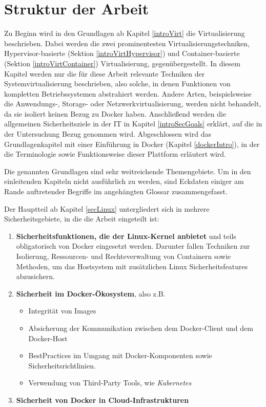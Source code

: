 \documentclass[../main.tex]{subfiles}
\begin{document}

  \section{Struktur der Arbeit}
    Zu Beginn wird in den Grundlagen ab Kapitel \ref{introVirt} die Virtualisierung beschrieben. Dabei werden die zwei prominentesten Virtualisierungstechniken, Hypervisor-basierte (Sektion \ref{introVirtHypervisor}) und Container-basierte (Sektion \ref{introVirtContainer}) Virtualisierung, gegenübergestellt. In diesem Kapitel werden nur die für diese Arbeit relevante Techniken der Systemvirtualisierung beschrieben, also solche, in denen Funktionen von kompletten Betriebssystemen abstrahiert werden. Andere Arten, beispielsweise die Anwendungs-, Storage- oder Netzwerkvirtualisierung, werden nicht behandelt, da sie isoliert keinen Bezug zu Docker haben. Anschließend werden die allgemeinen Sicherheitsziele in der \acrshort{IT} in Kapitel \ref{introSecGoals} erklärt, auf die in der Untersuchung Bezug genommen wird. Abgeschlossen wird das Grundlagenkapitel mit einer Einführung in Docker (Kapitel \ref{dockerIntro}), in der die Terminologie sowie Funktionsweise dieser Plattform erläutert wird.

    Die genannten Grundlagen sind sehr weitreichende Themengebiete. Um in den einleitenden Kapiteln nicht ausführlich zu werden, sind Eckdaten einiger am Rande auftretender Begriffe im angehängten Glossar zusammengefasst.

    Der Hauptteil ab Kapitel \ref{secLinux} untergliedert sich in mehrere Sicherheitsgebiete, in die die Arbeit eingeteilt ist:
    \begin{enumerate}
      \item \textbf{Sicherheitsfunktionen, die der Linux-Kernel anbietet} und teils obligatorisch von Docker eingesetzt werden. Darunter fallen Techniken zur Isolierung, Ressourcen- und Rechteverwaltung von Containern sowie Methoden, um das Hostsystem mit zusätzlichen Linux Sicherheitsfeatures abzusichern.
      \item \textbf{Sicherheit im Docker-Ökosystem}, also z.B.
        \begin{itemize}
          \item Integrität von Images
          \item Absicherung der Kommunikation zwischen dem Docker-Client und dem Docker-Host
          \item \glspl{BestPractice} im Umgang mit Docker-Komponenten sowie Sicherheitsrichtlinien.
          \item Verwendung von Third-Party Tools, wie \emph{Kubernetes} %
        \end{itemize}
      \item \textbf{Sicherheit von Docker in Cloud-Infrastrukturen}
    \end{enumerate}
\end{document}
